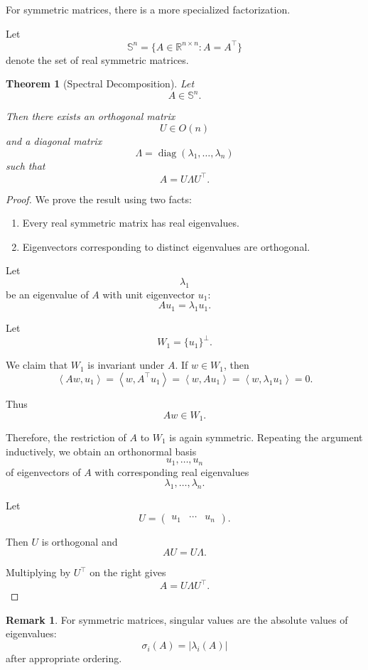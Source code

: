 \documentclass[12pt,oneside]{book}
\numberwithin{equation}{section}
\theoremstyle{definition}
\newtheorem{remark}{Remark}[section]
\theoremstyle{plain}
\newtheorem{theorem}{Theorem}[section]
\theoremstyle{remark}
\newcommand{\R}{\mathbb{R}}
\newcommand{\inner}[2]{\left\langle #1, #2 \right\rangle}
\newcommand{\diag}{\operatorname{diag}}
\begin{document}
For symmetric matrices, there is a more specialized factorization.

Let
\[
\mathbb{S}^n
=
\{A\in\R^{n\times n}:A=A^\top\}
\]
denote the set of real symmetric matrices.

\begin{theorem}[Spectral Decomposition]
Let
\[
A\in\mathbb{S}^n.
\]

Then there exists an orthogonal matrix
\[
U\in O(n)
\]
and a diagonal matrix
\[
\Lambda
=
\diag(\lambda_1,\dots,\lambda_n)
\]
such that
\[
A=U\Lambda U^\top.
\]
\end{theorem}

\begin{proof}
We prove the result using two facts:

\begin{enumerate}
\item Every real symmetric matrix has real eigenvalues.
\item Eigenvectors corresponding to distinct eigenvalues are orthogonal.
\end{enumerate}

Let
\[
\lambda_1
\]
be an eigenvalue of $A$ with unit eigenvector $u_1$:
\[
Au_1=\lambda_1u_1.
\]

Let
\[
W_1=\{u_1\}^{\perp}.
\]

We claim that $W_1$ is invariant under $A$. If $w\in W_1$, then
\[
\inner{Aw}{u_1}
=
\inner{w}{A^\top u_1}
=
\inner{w}{Au_1}
=
\inner{w}{\lambda_1u_1}
=
0.
\]

Thus
\[
Aw\in W_1.
\]

Therefore, the restriction of $A$ to $W_1$ is again symmetric. Repeating the argument inductively, we obtain an orthonormal basis
\[
u_1,\dots,u_n
\]
of eigenvectors of $A$ with corresponding real eigenvalues
\[
\lambda_1,\dots,\lambda_n.
\]

Let
\[
U=
\begin{pmatrix}
u_1 & \cdots & u_n
\end{pmatrix}.
\]

Then $U$ is orthogonal and
\[
AU
=
U\Lambda.
\]

Multiplying by $U^\top$ on the right gives
\[
A
=
U\Lambda U^\top.
\]
\end{proof}

\begin{remark}
For symmetric matrices, singular values are the absolute values of eigenvalues:
\[
\sigma_i(A)=|\lambda_i(A)|
\]
after appropriate ordering.
\end{remark}
\end{document}

